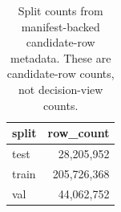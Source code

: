 \begin{table}[t]
  \centering
  \small
  \caption{Split counts from manifest-backed candidate-row metadata. These are candidate-row counts, not decision-view counts.}
  \label{tab:split-counts}
  \begin{tabular}{@{}lr@{}}
    \toprule
    split & row\_count \\
    \midrule
    test & 28,205,952 \\
    train & 205,726,368 \\
    val & 44,062,752 \\
    \bottomrule
  \end{tabular}
\end{table}
